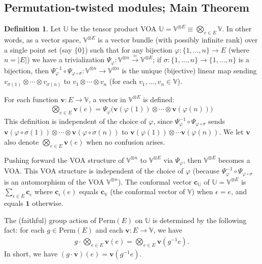 \documentclass[11pt,b5paper,notitlepage]{article}
\theoremstyle{definition}
\newtheorem{df}{Definition}[subsection]
\theoremstyle{plain}
\newcommand{\id}{\mathbf{1}}
\newcommand{\Vbb}{\mathbb V}
\newcommand{\Ubb}{\mathbb U}
\newcommand{\cbf}{\mathbf c}
\newcommand{\vbf}{\mathbf v}
\newcommand{\Perm}{\mathrm{Perm}}
\numberwithin{equation}{subsection}
\begin{document}
\subsection{Permutation-twisted modules; Main Theorem}\label{lb23}


\begin{df}\label{lb72}
Let $\Ubb$ be the tensor product VOA $\Ubb=\Vbb^{\otimes E}\equiv\bigotimes_{e\in E}\Vbb$. In other words, as a vector space, $\Vbb^{\otimes E}$ is a vector bundle (with possibly infinite rank) over a single point set (say $\{0\}$) such that for any bijection  $\varphi:\{1,\dots,n\}\rightarrow E$ (where $n=|E|$) we have a trivialization $\Psi_\varphi:\Vbb^{\otimes n}\xrightarrow{\simeq} \Vbb^{\otimes E}$; if $\sigma:\{1,\dots,n\}\rightarrow\{1,\dots,n\}$ is a bijection, then $\Psi_\varphi^{-1}\circ\Psi_{\varphi\circ\sigma}:\Vbb^{\otimes n}\rightarrow\Vbb^{\otimes n}$ is the unique (bijective) linear map sending $v_{\sigma(1)}\otimes\cdots\otimes v_{\sigma(n)}$ to $v_1\otimes\cdots\otimes v_n$ (for each $v_1,\dots,v_n\in\Vbb$). 

For each function $\vbf:E\rightarrow\Vbb$, a vector in $\Vbb^{\otimes E}$ is defined:
\begin{align}\label{eq104}
\bigotimes_{e\in E} \vbf(e)=\Psi_\varphi\Big(\vbf(\varphi(1))\otimes\cdots \otimes\vbf(\varphi(n))\Big)
\end{align} 
This definition is independent of the choice of $\varphi$, since $\Psi_\varphi^{-1}\circ\Psi_{\varphi\circ\sigma}$ sends $\vbf(\varphi\circ\sigma(1))\otimes\cdots \otimes\vbf(\varphi\circ\sigma(n))$ to $\vbf(\varphi(1))\otimes\cdots \vbf(\varphi(n))$. We let $\vbf$ also denote $\bigotimes_{e\in E}\vbf(e)$ when no confusion arises.

Pushing forward the VOA structure of $\Vbb^{\otimes n}$ to $\Vbb^{\otimes E}$ via $\Psi_\varphi$, then $\Vbb^{\otimes E}$ becomes a VOA. This VOA structure is independent of the choice of $\varphi$ (because $\Psi_\varphi^{-1}\circ\Psi_{\varphi\circ\sigma}$ is an automorphism of the VOA $\Vbb^{\otimes n}$). The conformal vector $\cbf_\Ubb$ of $\Ubb=\Vbb^{\otimes E}$ is $\sum_{\epsilon\in E}\cbf_\epsilon$ where $\cbf_\epsilon(e)$ equals $\cbf_\Vbb$ (the conformal vector of $\Vbb$) when $\epsilon=e$, and equals $\id$ otherwise.

The (faithful) group action of $\Perm(E)$ on $\Ubb$ is determined by the following fact: for each $g\in\Perm(E)$ and each $\vbf:E\rightarrow \Vbb$, we have
\begin{align}
g\cdot \bigotimes_{e\in E}\vbf(e)=\bigotimes_{e\in E}\vbf(g^{-1}e).
\end{align}
In short, we have $(g\cdot \vbf)(e)=\vbf(g^{-1}e)$.  \hfill\qedsymbol
\end{df}
\end{document}
